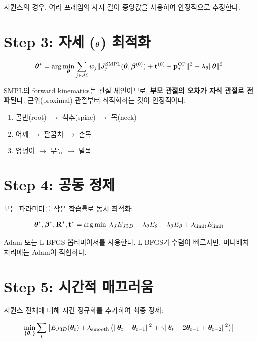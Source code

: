 \documentclass[11pt, a4paper]{report}
\begin{document}
시퀀스의 경우, 여러 프레임의 사지 길이 중앙값을 사용하여 안정적으로 추정한다.


\section{Step 3: 자세 ($\bm{\theta}$) 최적화}

\begin{equation}
\bm{\theta}^* = \arg\min_{\bm{\theta}} \sum_{j \in \mathcal{M}} w_j \| J_j^{\text{SMPL}}(\bm{\theta}, \bm{\beta}^{(0)}) + \mathbf{t}^{(0)} - \mathbf{p}_j^{\text{OP}} \|^2
  + \lambda_\theta \|\bm{\theta}\|^2
\end{equation}

\begin{importantnote}
SMPL의 forward kinematics는 관절 체인이므로,
\textbf{부모 관절의 오차가 자식 관절로 전파}된다.
근위(proximal) 관절부터 최적화하는 것이 안정적이다:
\begin{enumerate}[nosep]
  \item 골반(root) $\rightarrow$ 척추(spine) $\rightarrow$ 목(neck)
  \item 어깨 $\rightarrow$ 팔꿈치 $\rightarrow$ 손목
  \item 엉덩이 $\rightarrow$ 무릎 $\rightarrow$ 발목
\end{enumerate}
\end{importantnote}


\section{Step 4: 공동 정제}

모든 파라미터를 작은 학습률로 동시 최적화:

\begin{equation}
\bm{\theta}^*, \bm{\beta}^*, \mathbf{R}^*, \mathbf{t}^* = \arg\min \;
  \lambda_J E_{J3D} + \lambda_\theta E_\theta + \lambda_\beta E_\beta + \lambda_{\text{limit}} E_{\text{limit}}
\end{equation}

Adam 또는 L-BFGS 옵티마이저를 사용한다.
L-BFGS가 수렴이 빠르지만, 미니배치 처리에는 Adam이 적합하다.


\section{Step 5: 시간적 매끄러움}

시퀀스 전체에 대해 시간 정규화를 추가하여 최종 정제:

\begin{equation}
\min_{\{\bm{\theta}_t\}} \sum_t \left[
  E_{J3D}(\bm{\theta}_t) + \lambda_{\text{smooth}} \left(
    \|\bm{\theta}_t - \bm{\theta}_{t-1}\|^2 + \gamma \|\bm{\theta}_t - 2\bm{\theta}_{t-1} + \bm{\theta}_{t-2}\|^2
  \right)
\right]
\end{equation}
\end{document}
